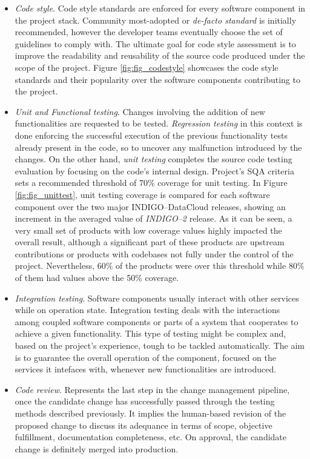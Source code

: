\documentclass[journal]{IEEEtran}
\begin{document}
\begin{itemize}
\item \textit{Code style}.
Code style standards are enforced for every software component in the project stack. Community
most-adopted or \textit{de-facto standard} is initially recommended, however the developer teams eventually
choose the set of guidelines to comply with. The ultimate goal for code style assessment is to
improve the readability and reusability of the source code produced under the scope of the
project. Figure \ref{fig:fig_codestyle} showcases the code style standards and their popularity
over the software components contributing to the project.

\item \textit{Unit and Functional testing}.
Changes involving the addition of new functionalities are requested to be tested. \textit{Regression
testing} in this context is done enforcing the successful execution of the previous
functionality tests already present in the code, so to uncover any malfunction introduced by
the changes. On the other hand, \textit{unit testing} completes the source code testing evaluation by
focusing on the code's internal design. Project's SQA criteria sets a recommended threshold of
70\% coverage for unit testing. In Figure \ref{fig:fig_unittest}, unit testing coverage is compared
for each software component over the two major INDIGO--DataCloud releases, showing an increment in the 
averaged value of {\sl INDIGO--2} release. As it can be seen, a very small set of products with low coverage
values highly impacted the overall result, although a significant part of these products are upstream
contributions or products with codebases not fully under the control of the project. Nevertheless,
60\% of the products were over this threshold while 80\% of them had values above
the 50\% coverage.

\item \textit{Integration testing}. Software components usually interact with other services while on
operation state. Integration testing deals with the interactions among coupled software components or
parts of a system that cooperates to achieve a given functionality. This type of testing might be 
complex and, based on the project's experience, tough to be tackled automatically. The aim is to 
guarantee the overall operation of the component, focused on the services it intefaces with, whenever
new functionalities are introduced.

\item \textit{Code review}.
Represents the last step in the change management pipeline, once the candidate change has 
successfully passed through the testing methods described previously. It implies the human-based
revision of the proposed change to discuss its adequance in terms of scope, objective fulfillment, 
documentation completeness, etc. On approval, the candidate change is definitely merged into
production.


\end{itemize}
\end{document}
